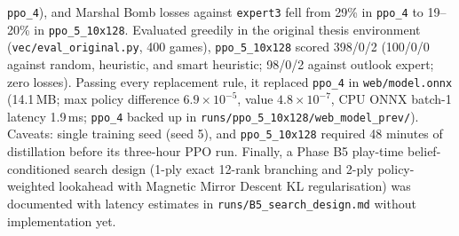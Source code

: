 \texttt{ppo\_4}), and Marshal Bomb losses against \texttt{expert3} fell from 29\% in \texttt{ppo\_4}
to 19--20\% in \texttt{ppo\_5\_10x128}. Evaluated greedily in the original thesis environment
(\texttt{vec/eval\_original.py}, 400 games), \texttt{ppo\_5\_10x128} scored 398/0/2 (100/0/0 against
random, heuristic, and smart heuristic; 98/0/2 against outlook expert; zero losses). Passing every
replacement rule, it replaced \texttt{ppo\_4} in \texttt{web/model.onnx} (14.1\,MB; max policy
difference $6.9 \times 10^{-5}$, value $4.8 \times 10^{-7}$, CPU ONNX batch-1 latency 1.9\,ms;
\texttt{ppo\_4} backed up in \texttt{runs/ppo\_5\_10x128/web\_model\_prev/}). Caveats: single
training seed (seed 5), and \texttt{ppo\_5\_10x128} required 48 minutes of distillation before its
three-hour PPO run. Finally, a Phase B5 play-time belief-conditioned search design (1-ply exact
12-rank branching and 2-ply policy-weighted lookahead with Magnetic Mirror Descent
\cite{Ataraxos2025} KL regularisation) was documented with latency estimates in
\texttt{runs/B5\_search\_design.md} without implementation yet.

